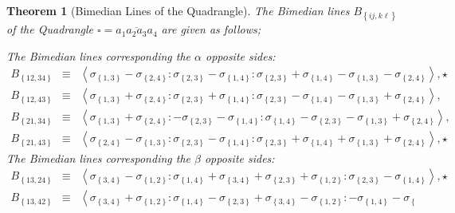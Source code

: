 \documentclass{unswthesis}
\newtheorem{theorem}{Theorem}
\begin{document}
\begin{theorem}[Bimedian Lines of the Quadrangle]
The Bimedian lines $B_{\left\{ ij,k\ell \right\} }$ of the Quadrangle $%
\square =\overline{a_{1}a_{2}a_{3}a_{4}}$ are given as follows;

The Bimedian lines corresponding the $\alpha $ opposite sides:%
\begin{eqnarray*}
B_{\left\{ 12,34\right\} } &\equiv &\left\langle \sigma _{\left\{
1,3\right\} }-\sigma _{\left\{ 2,4\right\} }:\sigma _{\left\{ 2,3\right\}
}-\sigma _{\left\{ 1,4\right\} }:\sigma _{\left\{ 2,3\right\} }+\sigma
_{\left\{ 1,4\right\} }-\sigma _{\left\{ 1,3\right\} }-\sigma _{\left\{
2,4\right\} }\right\rangle ,\star  \\
B_{\left\{ 12,43\right\} } &\equiv &\left\langle \sigma _{\left\{
1,3\right\} }+\sigma _{\left\{ 2,4\right\} }:\sigma _{\left\{ 2,3\right\}
}+\sigma _{\left\{ 1,4\right\} }:\sigma _{\left\{ 2,3\right\} }-\sigma
_{\left\{ 1,4\right\} }-\sigma _{\left\{ 1,3\right\} }+\sigma _{\left\{
2,4\right\} }\right\rangle , \\
B_{\left\{ 21,34\right\} } &\equiv &\left\langle \sigma _{\left\{
1,3\right\} }+\sigma _{\left\{ 2,4\right\} }:-\sigma _{\left\{ 2,3\right\}
}-\sigma _{\left\{ 1,4\right\} }:\sigma _{\left\{ 1,4\right\} }-\sigma
_{\left\{ 2,3\right\} }-\sigma _{\left\{ 1,3\right\} }+\sigma _{\left\{
2,4\right\} }\right\rangle , \\
B_{\left\{ 21,43\right\} } &\equiv &\left\langle \sigma _{\left\{
2,4\right\} }-\sigma _{\left\{ 1,3\right\} }:\sigma _{\left\{ 2,3\right\}
}-\sigma _{\left\{ 1,4\right\} }:\sigma _{\left\{ 2,3\right\} }+\sigma
_{\left\{ 1,4\right\} }+\sigma _{\left\{ 1,3\right\} }+\sigma _{\left\{
2,4\right\} }\right\rangle ,\star 
\end{eqnarray*}%
The Bimedian lines corresponding the $\beta $ opposite sides:%
\begin{eqnarray*}
B_{\left\{ 13,24\right\} } &\equiv &\left\langle \sigma _{\left\{
3,4\right\} }-\sigma _{\left\{ 1,2\right\} }:\sigma _{\left\{ 1,4\right\}
}+\sigma _{\left\{ 3,4\right\} }+\sigma _{\left\{ 2,3\right\} }+\sigma
_{\left\{ 1,2\right\} }:\sigma _{\left\{ 2,3\right\} }-\sigma _{\left\{
1,4\right\} }\right\rangle ,\star  \\
B_{\left\{ 13,42\right\} } &\equiv &\left\langle \sigma _{\left\{
3,4\right\} }+\sigma _{\left\{ 1,2\right\} }:\sigma _{\left\{ 1,4\right\}
}-\sigma _{\left\{ 2,3\right\} }+\sigma _{\left\{ 3,4\right\} }-\sigma
_{\left\{ 1,2\right\} }:-\sigma _{\left\{ 1,4\right\} }-\sigma _{\left\{
}
\end{eqnarray*}
\end{theorem}
\end{document}
